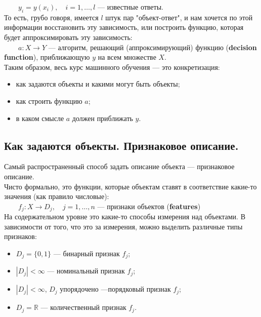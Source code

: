 \documentclass{article}
\begin{document}
$\qquad y_i = y(x_i),\quad i = 1, \ldots,l$ --- известные ответы.
\\

То есть, грубо говоря, имеется $l$ штук пар "объект-ответ", и нам хочется по этой информации восстановить эту зависимость, или построить функцию, которая будет аппроксимировать эту зависимость:
\\

$\qquad a: X \rightarrow Y$ --- алгоритм, решающий (аппроксимирующий) функцию (\textbf{decision function}),
приближающую $y$ на всем множестве $X$.
\\

Таким образом, весь курс машинного обучения --- это конкретизация:

\begin{itemize}
\item как задаются объекты и какими могут быть объекты;
\item как строить функцию $a$;
\item в каком смысле $a$ должен приближать $y$.
\end{itemize}

\newpage
\subsection{Как задаются объекты. Признаковое описание.}

Самый распространенный способ задать описание объекта --- признаковое описание.
\\

Чисто формально, это функции, которые объектам ставят в соответствие какие-то значения (как правило числовые):
\\

$\qquad f_j: X \rightarrow D_j,\quad j = 1, \ldots, n$
--- признаки объектов (\textbf{features})
\\

На содержательном уровне это какие-то способы измерения над объектами. В зависимости от того, что это за измерения, можно выделить различные типы признаков:

\begin{itemize}
\item $D_j = \{0, 1\}$ --- бинарный признак $f_j$;

\item $|D_j| < \infty$ --- номинальный признак $f_j$;

\item $|D_j| < \infty$,   $D_j$ упорядочено ---порядковый признак $f_j$;

\item $D_j = \mathbb{R}$ --- количественный признак $f_j$.
\end{itemize}
\end{document}
